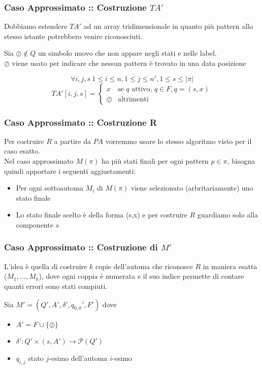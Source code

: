 \documentclass{beamer}
\begin{document}
\begin{frame}
\frametitle{Caso Approssimato :: Costruzione $TA'$}
Dobbiamo estendere $TA'$ ad un array tridimensionale in quanto più pattern allo stesso istante potrebbero venire riconosciuti.\\
\begin{definition}
Sia $\oslash \not\in Q$ un simbolo nuovo che non appare negli stati e nelle label. \\
$\oslash$ viene usato per indicare che nessun pattern è trovato in una data posizione
\end{definition}

\begin{equation*}
\forall  i,j,s\ 1\leq i \leq n, 1 \leq j \leq n',1 \leq s \leq |\pi|
\end{equation*}
\begin{equation*}
TA'[i,j,s]= 
\begin{cases} 
x & \text{se $q$ attivo, $q\in F, q = (s,x)$}
\\
\oslash  &\text{altrimenti}
\end{cases}
\end{equation*}
\end{frame}


\begin{frame}
\frametitle{Caso Approssimato :: Costruzione R}

Per costruire $R$ a partire da $PA$ vorremmo usare lo stesso algoritmo visto per il caso esatto.\\
Nel caso approssimato $M(\pi)$ ha più stati finali per ogni pattern $p \in \pi$, bisogna quindi apportare i seguenti aggiustamenti:
\begin{itemize}
\item Per ogni sottoautoma $M_i$ di $M(\pi)$ viene selezionato (arbritariamente) uno stato finale
\item Lo stato finale scelto è della forma (s,x) e per costruire $R$ guardiamo solo alla componente $s$
\end{itemize}

\end{frame}


\begin{frame}
\frametitle{Caso Approssimato :: Costruzione di $M'$ }

L'idea è quella di costruire $k$ copie dell'automa che riconosce $R$ in maniera esatta ($M_1,\dots,M_k$), dove ogni coppia è numerata e il suo indice permette di contare quanti errori sono stati compiuti.
\begin{definition}
Sia $M' = (Q',A',\delta',q_{0,0}', F')$ dove
	\begin{itemize}
		\item $A' = F \cup \{\oslash\}$
		\item $\delta' : Q' \times (s,A') \to \mathcal{P}(Q')$
		\item $q_{i,j}$ stato $j$-esimo dell'automa $i$-esimo
	\end{itemize}
\end{definition}





\end{frame}
\end{document}
